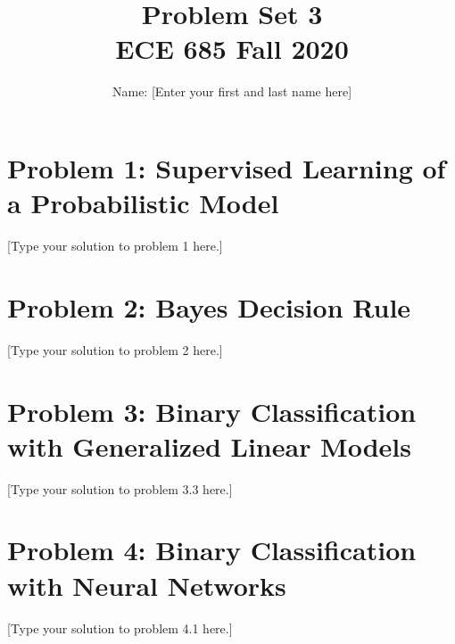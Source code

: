 \documentclass{article}
\title{Problem Set 3 \\ ECE 685 Fall 2020}
\author{%
  Name: [Enter your first and last name here]
}
\begin{document}
\maketitle


\section*{Problem 1: Supervised Learning of a Probabilistic Model}
[Type your solution to problem 1 here.]


\section*{Problem 2: Bayes Decision Rule }
[Type your solution to problem 2 here.]

\section*{Problem 3: Binary Classification with Generalized Linear Models}
[Type your solution to problem 3.3 here.]

\section*{Problem 4:  Binary Classification with Neural Networks}
[Type your solution to problem 4.1 here.]
\end{document}
